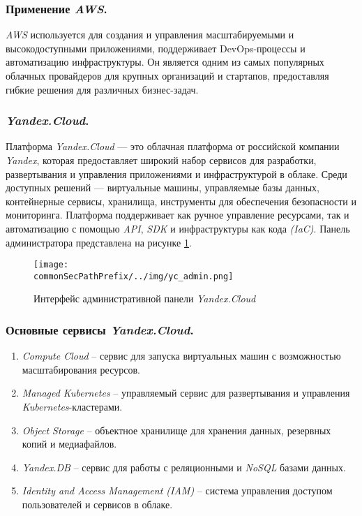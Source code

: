 \subsubsection{Применение \textit{AWS}.}
\textit{AWS} используется для создания и управления масштабируемыми и высокодоступными приложениями, поддерживает DevOps-процессы и автоматизацию инфраструктуры. Он является одним из самых популярных облачных провайдеров для крупных организаций и стартапов, предоставляя гибкие решения для различных бизнес-задач.

\subsubsection{\textit{Yandex.Cloud}.}
\label{sec:yandex_cloud}
Платформа \textit{Yandex.Cloud} — это облачная платформа от российской компании \textit{Yandex}, которая предоставляет широкий набор сервисов для разработки, развертывания и управления приложениями и инфраструктурой в облаке.
Среди доступных решений — виртуальные машины, управляемые базы данных, контейнерные сервисы, хранилища, инструменты для обеспечения безопасности и мониторинга.
Платформа поддерживает как ручное управление ресурсами, так и автоматизацию с помощью \textit{API}, \textit{SDK} и инфраструктуры как кода \textit{(IaC)}. Панель администратора представлена на рисунке \ref{fig:user_guide:yc_admin}.

\begin{figure}[ht]
    \centering
    \texttt{[image: \\commonSecPathPrefix/../img/yc\_admin.png]}
    \caption{Интерфейс административной панели \textit{Yandex.Cloud}}
    \label{fig:user_guide:yc_admin}
\end{figure}

\subsubsection{Основные сервисы \textit{Yandex.Cloud}.}
\begin{enumerate}
    \item \textit{Compute Cloud} -- сервис для запуска виртуальных машин с возможностью масштабирования ресурсов.
    \item \textit{Managed Kubernetes} -- управляемый сервис для развертывания и управления \textit{Kubernetes}-кластерами.
    \item \textit{Object Storage} -- объектное хранилище для хранения данных, резервных копий и медиафайлов.
    \item \textit{Yandex.DB} -- сервис для работы с реляционными и \textit{NoSQL} базами данных.
    \item \textit{Identity and Access Management (IAM)} -- система управления доступом пользователей и сервисов в облаке.
\end{enumerate}

